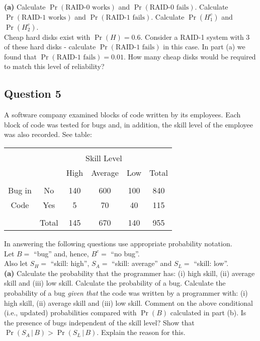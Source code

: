 \documentclass[12pt]{article}
\begin{document}
{\bf(a)} Calculate $\Pr(\text{RAID-0 works})$ and $\Pr(\text{RAID-0 fails})$.  Calculate $\Pr(\text{RAID-1 works})$ and $\Pr(\text{RAID-1 fails})$.  Calculate $\Pr(H_1^c)$ and $\Pr(H_2^c)$. \\[0.3cm]
 Cheap hard disks exist with $\Pr(H) = 0.6$. Consider a RAID-1 system with 3 of these hard disks - calculate $\Pr(\text{RAID-1 fails})$ in this case.  In part (a) we found that $\Pr(\text{RAID-1 fails}) = 0.01$. How many cheap disks would be required to match this level of reliability?


\subsection*{Question 5}
A software company examined blocks of code written by its employees. Each block of code was tested for bugs and, in addition, the skill level of the employee was also recorded. See table:
\begin{center}
\begin{tabular}{|cc|ccc|c|}
\hline
&&&&&\\[-0.4cm]
    && \multicolumn{3}{|c|}{Skill Level} &  \\
    && High & Average & Low & Total \\
\hline
&&&&&\\[-0.4cm]
Bug in   & No    &  140 &   600  & 100 & 840 \\
Code & Yes   &    5 &    70  &  40 & 115 \\
\hline
&&&&&\\[-0.4cm]
&Total &  145 &   670  & 140 & 955 \\
\hline
\end{tabular}
\end{center}
In answering the following questions use appropriate probability notation.\\[0.2cm]
Let $B =$ ``bug'' and, hence, $B^c =$ ``no bug''.\\[0.1cm]
Also let $S_H = $ ``skill: high'', $S_A = $ ``skill: average'' and $S_L =$ ``skill: low''.\\[-0.2cm]

{\bf(a)} Calculate the probability that the programmer has: (i) high skill, (ii) average skill and (iii) low skill.  Calculate the probability of a bug.  Calculate the probability of a bug \emph{given that} the code was written by a programmer with: (i) high skill, (ii) average skill and (iii) low skill.  Comment on the above conditional (i.e., updated) probabilities compared with $\Pr(B)$ calculated in part (b). Is the presence of bugs independent of the skill level?  Show that $\Pr(S_A\,|\,B) > \Pr(S_L\,|\,B)$. Explain the reason for this.
\end{document}

